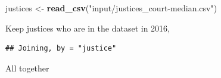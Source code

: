\documentclass[]{book}
\newenvironment{Shaded}{\begin{snugshade}}{\end{snugshade}}
\newcommand{\CommentTok}[1]{\textcolor[rgb]{0.56,0.35,0.01}{\textit{#1}}}
\newcommand{\DataTypeTok}[1]{\textcolor[rgb]{0.13,0.29,0.53}{#1}}
\newcommand{\DecValTok}[1]{\textcolor[rgb]{0.00,0.00,0.81}{#1}}
\newcommand{\KeywordTok}[1]{\textcolor[rgb]{0.13,0.29,0.53}{\textbf{#1}}}
\newcommand{\NormalTok}[1]{#1}
\newcommand{\OperatorTok}[1]{\textcolor[rgb]{0.81,0.36,0.00}{\textbf{#1}}}
\newcommand{\StringTok}[1]{\textcolor[rgb]{0.31,0.60,0.02}{#1}}
\theoremstyle{definition}
\theoremstyle{definition}
\theoremstyle{definition}
\theoremstyle{remark}
\begin{document}
\begin{Shaded}
\begin{Highlighting}[]
\NormalTok{justices <-}\StringTok{ }\KeywordTok{read_csv}\NormalTok{(}\StringTok{"input/justices_court-median.csv"}\NormalTok{)}
\end{Highlighting}
\end{Shaded}

Keep justices who are in the dataset in 2016,

\begin{Shaded}
\end{Shaded}

\begin{verbatim}
## Joining, by = "justice"
\end{verbatim}

All together
\end{document}
